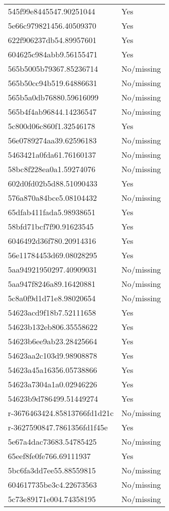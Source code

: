 \begin{tabular}{ll}
545f99e8445547.90251044 & Yes \\
5e66c979821456.40509370 & Yes \\
622f906237db54.89957601 & Yes \\
604625c984abb9.56155471 & Yes \\
565b5005b79367.85236714 & No/missing \\
565b50cc94b519.64886631 & No/missing \\
565b5a0db76880.59616099 & No/missing \\
565b4f4ab96844.14236547 & No/missing \\
5c800d06c860f1.32546178 & Yes \\
56e0789274aa39.62596183 & No/missing \\
5463421a0fda61.76160137 & No/missing \\
58bc8f228ea0a1.59274076 & No/missing \\
602d0fd02b5d88.51090433 & Yes \\
576a870a84bce5.08104432 & No/missing \\
65dfab411fada5.98938651 & Yes \\
58bfd71bcf7f90.91623545 & Yes \\
6046492d36f780.20914316 & Yes \\
56e11784453d69.08028295 & Yes \\
5aa94921950297.40909031 & No/missing \\
5aa947f8246a89.16420881 & No/missing \\
5c8a0f9d1d71e8.98020654 & No/missing \\
54623acd9f18b7.52111658 & Yes \\
54623b132eb806.35558622 & Yes \\
54623b6ee9ab23.28425664 & Yes \\
54623aa2c103d9.98908878 & Yes \\
54623a45a16356.05738866 & Yes \\
54623a7304a1a0.02946226 & Yes \\
54623b9d786499.51449274 & Yes \\
r-3676463424.85813766fd1d21c & No/missing \\
r-3627590847.7861356fd1f45e & Yes \\
5e67a4dac73683.54785425 & No/missing \\
65eef8fe0fe766.69111937 & Yes \\
5bc6fa3dd7ee55.88559815 & No/missing \\
604617735be3c4.22673563 & No/missing \\
5c73e89171e004.74358195 & No/missing \\

\end{tabular}
